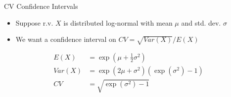 \documentclass{beamer}
\begin{document}


\begin{frame}{CV Confidence Intervals}
\begin{itemize}
	\item Suppose r.v. $X$ is distributed log-normal with mean $\mu$ and std. dev. $\sigma$
	\item We want a confidence interval on $CV=\sqrt{Var(X)}/E(X)$
\end{itemize}
\begin{align}
E(X) & =  \exp(\mu+\frac{1}{2} \sigma^{2}) \nonumber \\
Var(X) & =  \exp(2\mu + \sigma^{2})(\exp(\sigma^{2})-1) \nonumber \\
\label{eq:cv} CV & = \sqrt{\exp(\sigma^{2})-1}
\end{align}
\end{frame}
\end{document}
